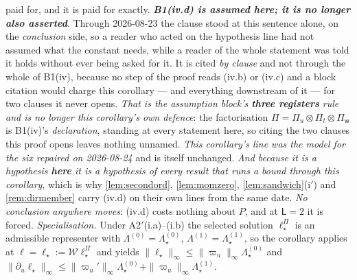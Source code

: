 \begin{corollary}
paid for, and it is paid for exactly.
\emph{\textbf{B1(iv.d) is assumed here; it is no longer also asserted}}. Through 2026-08-23 the clause
stood at this sentence alone, on the \emph{conclusion} side, so a reader who acted on the hypothesis
line had not assumed what the constant needs, while a reader of the whole statement was told it holds
without ever being asked for it. It is cited \emph{by clause} and not through the whole of B1(iv),
because no step of the proof reads \textup{(iv.b)} or \textup{(iv.c)} and a block citation would charge
this corollary --- and everything downstream of it --- for two clauses it never opens. \emph{That is the
assumption block's \textbf{three registers} rule and is no longer this corollary's own defence}: the
factorisation $\Pi=\Pi_u\otimes\Pi_t\otimes\Pi_{\mathsf w}$ is B1(iv)'s \emph{declaration}, standing at
every statement here, so citing the two clauses this proof opens leaves nothing unnamed. \emph{This
corollary's line was the model for the six repaired on 2026-08-24} and is itself unchanged.
\emph{And because it is a hypothesis \textbf{here} it is a hypothesis of every result that runs a bound
through this corollary}, which is why \cref{lem:secondord}, \cref{lem:momzero},
\cref{lem:sandwich}\textup{(i$'$)} and \cref{rem:dirmember} carry \textup{(iv.d)} on their own
lines from the same date. \emph{No conclusion anywhere moves}: \textup{(iv.d)} costs nothing about $P$,
and at $\mathsf L=2$ it is forced.
\emph{Specialisation.} Under A2$'$(i.a)--(i.b) the selected solution $\ell^\Pi_\star$ is an admissible
representer with $\Lambda^{(0)}=\Lambda^{(0)}_\star$, $\Lambda^{(1)}=\Lambda^{(1)}_\star$, so the
corollary applies at $\ell=\ell_\star:=\mathcal W\ell^\Pi_\star$ and yields
$\|\ell_\star\|_\infty\le\|\varpi_u\|_\infty\Lambda^{(0)}_\star$ and
$\|\partial_u\ell_\star\|_\infty\le\|\varpi_u'\|_\infty\Lambda^{(0)}_\star+\|\varpi_u\|_\infty\Lambda^{(1)}_\star$.
\end{corollary}

